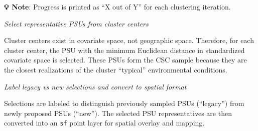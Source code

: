 \documentclass[
  10pt,
  b5paper,
  oneside]{book}
\newenvironment{Shaded}{\begin{snugshade}}{\end{snugshade}}
\newcommand{\AttributeTok}[1]{\textcolor[rgb]{0.13,0.29,0.53}{#1}}
\newcommand{\CommentTok}[1]{\textcolor[rgb]{0.56,0.35,0.01}{\textit{#1}}}
\newcommand{\DecValTok}[1]{\textcolor[rgb]{0.00,0.00,0.81}{#1}}
\newcommand{\FunctionTok}[1]{\textcolor[rgb]{0.13,0.29,0.53}{\textbf{#1}}}
\newcommand{\NormalTok}[1]{#1}
\newcommand{\OtherTok}[1]{\textcolor[rgb]{0.56,0.35,0.01}{#1}}
\newcommand{\SpecialCharTok}[1]{\textcolor[rgb]{0.81,0.36,0.00}{\textbf{#1}}}
\newcommand{\StringTok}[1]{\textcolor[rgb]{0.31,0.60,0.02}{#1}}
\begin{document}
\textbf{💡 Note}: Progress is printed as ``X out of Y'' for each clustering iteration.

\emph{Select representative PSUs from cluster centers}

Cluster centers exist in covariate space, not geographic space. Therefore, for each cluster center, the PSU with the minimum Euclidean distance in standardized covariate space is selected. These PSUs form the CSC sample because they are the closest realizations of the cluster ``typical'' environmental conditions.

\begin{Shaded}
\end{Shaded}

\emph{Label legacy vs new selections and convert to spatial format}

Selections are labeled to distinguish previously sampled PSUs (``legacy'') from newly proposed PSUs (``new''). The selected PSU representatives are then converted into an \texttt{sf} point layer for spatial overlay and mapping.
\end{document}

